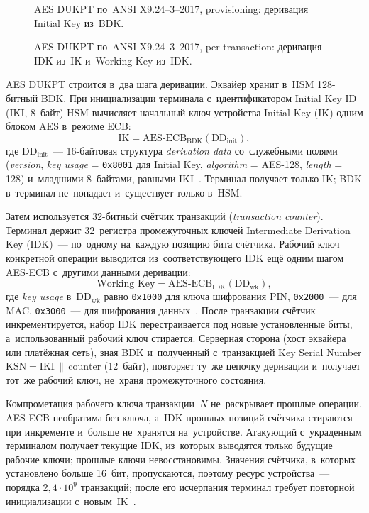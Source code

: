 \begin{figure}[tbp]
  \centering
  \caption{AES DUKPT по~ANSI X9.24--3--2017, provisioning: деривация Initial
  Key из~BDK.}\label{fig:crypto-dukpt-provisioning}
\end{figure}

\begin{figure}[tbp]
  \centering
  \caption{AES DUKPT по~ANSI X9.24--3--2017, per-transaction: деривация IDK
  из~IK и~Working Key из~IDK.}\label{fig:crypto-dukpt-transaction}
\end{figure}

AES DUKPT строится в~два шага деривации. Эквайер хранит в~HSM 128-битный BDK.
При инициализации терминала с~идентификатором Initial Key ID (IKI, 8~байт) HSM
вычисляет начальный ключ устройства Initial Key (IK) одним блоком AES в~режиме
ECB:
\[\text{IK} = \text{AES-ECB}_{\text{BDK}}(\text{DD}_{\text{init}}),\]
где $\text{DD}_{\text{init}}$~--- 16-байтовая структура \textit{derivation
data} со~служебными полями (\textit{version}, \textit{key usage} =
  \texttt{0x8001} для Initial Key, \textit{algorithm} = AES-128,
\textit{length} = 128) и~младшими 8~байтами, равными IKI~\cite{ansi-x9-24-3}.
Терминал получает только IK; BDK в~терминал не~попадает
и~существует только в~HSM.

Затем используется 32-битный счётчик транзакций (\textit{transaction counter}).
Терминал держит 32~регистра промежуточных ключей Intermediate Derivation Key
(IDK)~--- по~одному на~каждую позицию бита счётчика. Рабочий ключ
конкретной операции выводится из~соответствующего IDK ещё одним шагом AES-ECB
с~другими данными деривации:
\[\text{Working Key} = \text{AES-ECB}_{\text{IDK}}(\text{DD}_{\text{wk}}),\]
где \textit{key usage} в~$\text{DD}_{\text{wk}}$ равно \texttt{0x1000} для
ключа шифрования PIN, \texttt{0x2000}~--- для MAC, \texttt{0x3000}~--- для
шифрования данных~\cite{ansi-x9-24-3}. После транзакции счётчик
инкрементируется, набор IDK перестраивается под новые установленные биты,
а~использованный рабочий ключ стирается. Серверная сторона (хост эквайера или
платёжная сеть), зная BDK и~полученный с~транзакцией Key Serial Number
$\text{KSN} = \text{IKI} \,\|\, \text{counter}$ (12~байт), повторяет ту~же
цепочку деривации и~получает тот~же рабочий ключ, не~храня промежуточного
состояния.

Компрометация рабочего ключа транзакции~$N$ не~раскрывает прошлые операции.
AES-ECB необратима без ключа, а~IDK прошлых позиций счётчика стираются при
инкременте и~больше не~хранятся на~устройстве. Атакующий с~украденным
терминалом получает текущие IDK, из~которых выводятся только будущие рабочие
ключи; прошлые ключи невосстановимы. Значения счётчика, в~которых установлено больше 16~бит,
пропускаются, поэтому ресурс устройства~--- порядка $2{,}4\cdot10^9$ транзакций;
после его исчерпания терминал требует повторной инициализации
с~новым~IK~\cite{ansi-x9-24-3}.

